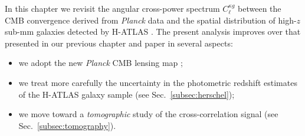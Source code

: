 %
%
%

In this chapter we revisit the angular cross-power spectrum $C_{\ell}^{\kappa g}$ between the \gls{CMB} convergence derived from \emph{Planck} data and the spatial distribution of high-$z$ sub-mm galaxies detected by H-ATLAS \citep{Eales2010a}. The present analysis improves over that presented in our  previous chapter and paper \citep[][hereafter B15]{Bianchini2015} in several aspects: 
\begin{itemize}
\item{we adopt the new \textit{Planck} \gls{CMB} lensing map \citep[][see Sec.~\eqref{subsec:planck}]{PlanckCollaboration2015};} 
\item{we treat more carefully the uncertainty in the photometric redshift estimates of the H-ATLAS galaxy sample (see Sec.~\eqref{subsec:herschel});} 
\item{we move toward a \textit{tomographic} study of the cross-correlation signal (see Sec.~\eqref{subsec:tomography}).}
\end{itemize}


